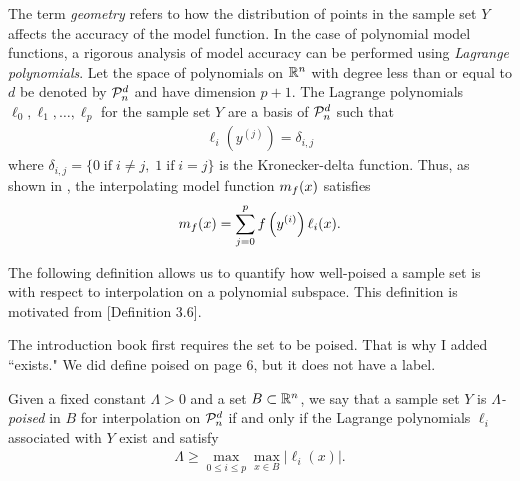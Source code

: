 \documentclass{article}
\begin{document}
\label{geometry}
The term \emph{geometry} refers to  how the distribution of points in the sample set $Y$ affects the accuracy of the model function.     In the case of polynomial model functions, a rigorous analysis of model accuracy can be performed using \emph{Lagrange polynomials}.
Let the space of polynomials on $\mathbb R^n$ with degree less than or equal to $d$ be denoted by $\mathcal{P}^d_n$ and have dimension $p+1$.
The Lagrange polynomials $\ell_0, \ell_1, \ldots, \ell_p$ for the sample set $Y$ are a basis of $\mathcal{P}^d_n$ such that
\begin{align}
\ell_i\left(y^{(j)}\right) = \delta_{i,j}  \label{interpolation_condition_lagrange}
\end{align}
where $\delta_{i,j} = \{0 \;\text{if}\; i\ne j,\; 1 \;\text{if} \; i = j \}$ is the Kronecker-delta function.
Thus, as shown in \cite{introduction_book},  the interpolating model function ${{m}_f}(x)$ 
satisfies
\begin{align}
\label{reg} 
{{m}_f}(x) = \sum^p_{j=0}f\left(y^{(i)}\right)\ell_i(x).
\end{align}

The following definition allows us to quantify how well-poised a sample set is with respect to interpolation on a polynomial subspace.
This definition is motivated from \cite{introduction_book}[Definition 3.6].

\color{magenta}
The introduction book first requires the set to be poised.
That is why I added ``exists."
We did define poised on page 6, but it does not have a label.
\color{black}


\begin{definition}
\label{lambda-poised}
Given a fixed constant $\Lambda>0$ and a set $B \subset \mathbb R^n$, we say that a sample set $Y$ is \emph{$\Lambda$-poised} in $B$ for interpolation on $\mathcal{P}^d_n$
if and only if the Lagrange polynomials $\ell_i$ associated with $Y$ exist and satisfy
\begin{align}
\Lambda \ge \max_{0\le i\le p}\max_{x\in B}|\ell_i(x)|.
\end{align}
\end{definition}
\end{document}
